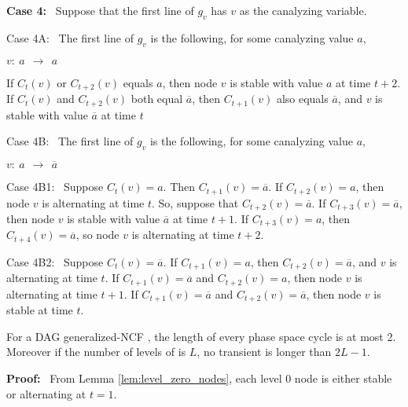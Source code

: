 \noindent
\textbf{Case 4:}~ Suppose that the first line of $g_v$ has $v$ as the canalyzing variable.

\begin{description}
\item{\textsf{Case 4A:}}~ The first line of $g_v$ is the following, for some canalyzing value $a$,

\noindent
\hspace*{1.1in} $v:~ a ~~\longrightarrow~~ a$


If $C_t(v)$ or $C_{t+2}(v)$ equals $a$,
then node $v$ is stable with value $a$ at time $t+2$.
If  $C_t(v)$  and $C_{t+2}(v)$ both equal $\overline{a}$,
then $C_{t+1}(v)$ also equals $\overline{a}$, and $v$ is stable with value $\overline{a}$ at time $t$

\item{\textsf{Case 4B:}}~ The first line of $g_v$ is the following, for some canalyzing value $a$,

\noindent
\hspace*{1.1in} $v:~ a ~~\longrightarrow~~ \overline{a}$


\begin{description}
\item{\textsf{Case 4B1:}}~ Suppose $C_t(v) = a$. 
Then $C_{t+1}(v) =  \overline{a}$. 
If $C_{t+2}(v) = a$, then node $v$ is alternating at time $t$.
So, suppose that $C_{t+2}(v) = \overline{a}$.
If $C_{t+3}(v) = \overline{a}$,
then node $v$ is stable with value $\overline{a}$ at time $t+1$.
If $C_{t+3}(v) = a$, then $C_{t+4}(v) = \overline{a}$,
so node $v$ is alternating at time $t+2$.

\item{\textsf{Case 4B2:}}~ Suppose $C_t(v) = \overline{a}$.
If $C_{t+1}(v) = a$, then $C_{t+2}(v) = \overline{a}$,
and $v$ is alternating at time $t$.
If $C_{t+1}(v) = \overline{a}$ and $C_{t+2}(v) = a$, then node $v$ is alternating at time $t+1$.
If $C_{t+1}(v) = \overline{a}$ and $C_{t+2}(v) =  \overline{a}$, then node $v$ is stable at time $t$.
\end{description} %

\end{description}
\QED

\begin{theorem}\label{thm:NCF_phase_space}
For a DAG generalized-NCF \cals{},
the length of every phase space cycle is at most 2.
Moreover if the number of levels of  \cals{} is $L$,
no transient is longer than $2L-1$.
\end{theorem}
\noindent
\textbf{Proof:}~ 
From Lemma \ref{lem:level_zero_nodes},
each level 0 node is either stable or alternating at $t=1$.



